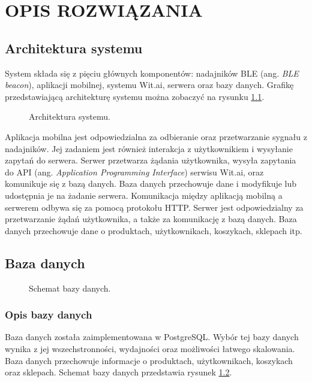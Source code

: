 \chapter{OPIS ROZWIĄZANIA}
\label{chapter:opis_rozwiazania}

\section{Architektura systemu}

System składa się z pięciu głównych komponentów: nadajników BLE (ang. \textit{BLE beacon}), aplikacji mobilnej, systemu Wit.ai, serwera oraz bazy danych. Grafikę przedstawiającą architekturę systemu można zobaczyć na rysunku \ref{fig:architecture}.

\begin{figure}[ht]
    \centering
    
    \caption{Architektura systemu.}
    \label{fig:architecture}
\end{figure}

Aplikacja mobilna jest odpowiedzialna za odbieranie oraz przetwarzanie sygnału z nadajników. Jej zadaniem jest również interakcja z użytkownikiem i wysyłanie zapytań do serwera. Serwer przetwarza żądania użytkownika, wysyła zapytania do API (ang. \textit{Application Programming Interface}) serwisu Wit.ai, oraz komunikuje się z bazą danych. Baza danych przechowuje dane i modyfikuje lub udostępnia je na żadanie serwera. Komunikacja między aplikacją mobilną a serwerem odbywa się za pomocą protokołu HTTP. Serwer jest odpowiedzialny za przetwarzanie żądań użytkownika, a także za komunikację z bazą danych. Baza danych przechowuje dane o produktach, użytkownikach, koszykach, sklepach itp.

\section{Baza danych}

\begin{figure}[ht]
    
    \caption{Schemat bazy danych.}
    \label{fig:database}
\end{figure}

\subsection{Opis bazy danych}

Baza danych została zaimplementowana w PostgreSQL. Wybór tej bazy danych wynika z jej wszechstronności, wydajności oraz możliwości łatwego skalowania. Baza danych przechowuje informacje o produktach, użytkownikach, koszykach oraz sklepach. Schemat bazy danych przedstawia rysunek \ref{fig:database}.


